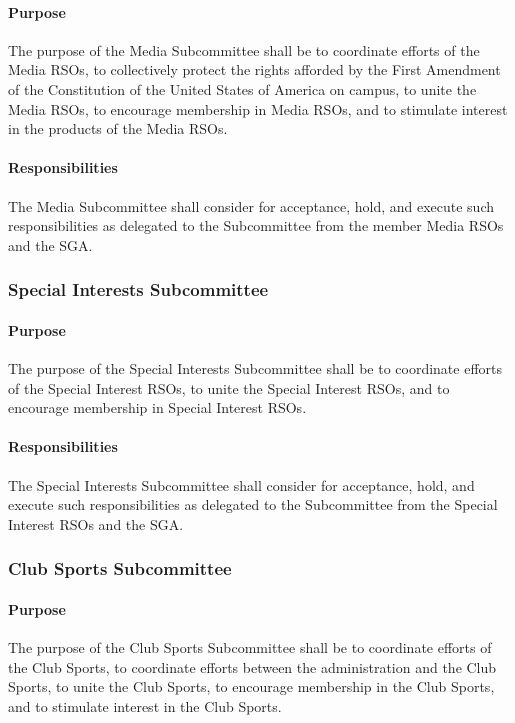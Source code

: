 \documentclass[12pt]{scrreprt}
\begin{document}
\paragraph{Purpose}
​The purpose of the Media Subcommittee shall be to coordinate efforts of the
Media RSOs, to collectively protect the rights afforded by the First Amendment of the
Constitution of the United States of America on campus, to unite the Media RSOs, to
encourage membership in Media RSOs, and to stimulate interest in the products of the
Media RSOs.

\paragraph{Responsibilities}
​The Media Subcommittee shall consider for acceptance, hold, and
execute such responsibilities as delegated to the Subcommittee from the member Media
RSOs and the SGA.

\subsubsection{Special Interests Subcommittee}

\paragraph{Purpose}
The purpose of the Special Interests Subcommittee shall be to coordinate
efforts of the Special Interest RSOs, to unite the Special Interest RSOs, and to encourage
membership in Special Interest RSOs.

\paragraph{Responsibilities}
​The Special Interests Subcommittee shall consider for acceptance,
hold, and execute such responsibilities as delegated to the Subcommittee from the Special
Interest RSOs and the SGA.

\subsubsection{Club Sports Subcommittee}

\paragraph{Purpose}
The purpose of the Club Sports Subcommittee shall be to coordinate efforts of
the Club Sports, to coordinate efforts between the administration and the Club Sports, to
unite the Club Sports, to encourage membership in the Club Sports, and to stimulate
interest in the Club Sports.
\end{document}
